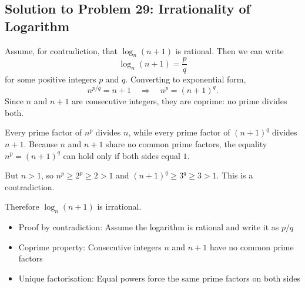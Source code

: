 \subsection{Solution to Problem 29: Irrationality of Logarithm}

\begin{solution}
Assume, for contradiction, that $\log_n(n+1)$ is rational. Then we can write
\[
\log_n(n+1) = \frac{p}{q}
\]
for some positive integers $p$ and $q$. Converting to exponential form,
\[
n^{p/q} = n + 1
\quad\Longrightarrow\quad
n^p = (n+1)^q.
\]
Since $n$ and $n+1$ are consecutive integers, they are coprime: no prime divides both.

Every prime factor of $n^p$ divides $n$, while every prime factor of $(n+1)^q$ divides $n+1$.
Because $n$ and $n+1$ share no common prime factors, the equality $n^p = (n+1)^q$ can hold only if both sides equal $1$.

But $n > 1$, so $n^p \ge 2^p \ge 2 > 1$ and $(n+1)^q \ge 3^q \ge 3 > 1$. This is a contradiction.

Therefore $\log_n(n+1)$ is irrational.
\end{solution}

\begin{takeaways}
\begin{itemize}
    \item Proof by contradiction: Assume the logarithm is rational and write it as $p/q$
    \item Coprime property: Consecutive integers $n$ and $n+1$ have no common prime factors
    \item Unique factorisation: Equal powers force the same prime factors on both sides
\end{itemize}
\end{takeaways}
